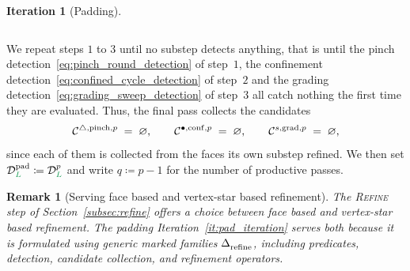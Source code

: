 \documentclass[a4paper, 12pt]{article}
\makeatletter
\DeclareRobustCommand{\candV}[1][]{\mathcal{C}^{\bullet\ifx\@empty#1\@empty\else,#1\fi}}
\DeclareRobustCommand{\candF}[1][]{\mathcal{C}^{\triangle\ifx\@empty#1\@empty\else,#1\fi}}
\DeclareRobustCommand{\candC}[1][]{\mathcal{C}^{s\ifx\@empty#1\@empty\else,#1\fi}}
\newcommand{\green}{\color{ForestGreen}}
\DeclareRobustCommand{\simplexsubsetTwo}[2][]{\Delta\ifx\@empty#1\@empty\else^{#1}\fi_{#2}}
\renewcommand{\L}{{\green L}}
\newtheorem{remark}[theorem]{Remark}
\theoremstyle{definition}
\newtheorem{iteration}[theorem]{Iteration}
\theoremstyle{plain}
\numberwithin{equation}{section}
\DeclareRobustCommand{\domseq}[1][]{\mathcal{D}\ifx\@empty#1\@empty\else_{#1}\fi}
\makeatother
\begin{document}
\begin{iteration}[Padding]
\begin{enumerate}[topsep=3pt, itemsep=-2pt]
\begin{equation}
    \end{equation}
\end{enumerate}
We repeat steps $1$ to $3$ until no substep detects anything, that is until the pinch detection~\eqref{eq:pinch_round_detection} of step~$1$, the confinement detection~\eqref{eq:confined_cycle_detection} of step~$2$ and the grading detection~\eqref{eq:grading_sweep_detection} of step~$3$ all catch nothing the first time they are evaluated. Thus, the final pass collects the candidates
\begin{equation}
    \label{eq:pad_stopping}
    \candF[\mathrm{pinch},p] \; = \; \varnothing, \qquad \candV[\mathrm{conf},p] \; = \; \varnothing, \qquad \candC[\mathrm{grad},p] \; = \; \varnothing ,
\end{equation}
since each of them is collected from the faces its own substep refined. We then set $\domseq[\L]^{\mathrm{pad}} \coloneq \domseq[\L]^{p}$ and write $q \coloneq p \! - \! 1$ for the number of productive passes.
\end{iteration}

\begin{remark}[Serving face based and vertex-star based refinement]
    The \textsc{Refine} step of Section~\ref{subsec:refine} offers a choice between face based and vertex-star based refinement. The padding Iteration~\ref{it:pad_iteration} serves both because it is formulated using generic marked families $\simplexsubsetTwo{\mathrm{refine}}$, including predicates, detection, candidate collection, and refinement operators.
\end{remark}
\end{document}
